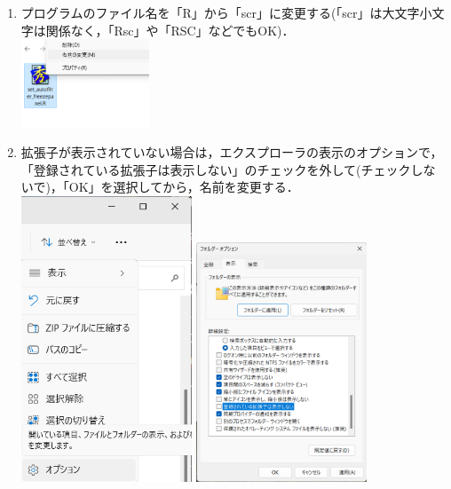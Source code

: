 \documentclass[
]{article}
\providecommand{\tightlist}{%
  \setlength{\itemsep}{0pt}\setlength{\parskip}{0pt}}
\begin{document}
\begin{enumerate}
\def\labelenumi{\arabic{enumi}.}
\tightlist
\item
  プログラムのファイル名を「R」から「scr」に変更する(「scr」は大文字小文字は関係なく，「Rsc」や「RSC」などでもOK)．\\
  \includegraphics[width=0.3\textwidth,height=\textheight]{img/assoc_01.png}
\item
  拡張子が表示されていない場合は，エクスプローラの表示のオプションで，「登録されている拡張子は表示しない」のチェックを外して(チェックしないで)，「OK」を選択してから，名前を変更する．\\
  \includegraphics[width=0.4\textwidth,height=\textheight]{img/assoc_00_01.png}
  \includegraphics[width=0.4\textwidth,height=\textheight]{img/assoc_00_02.png}

\end{enumerate}
\end{document}
